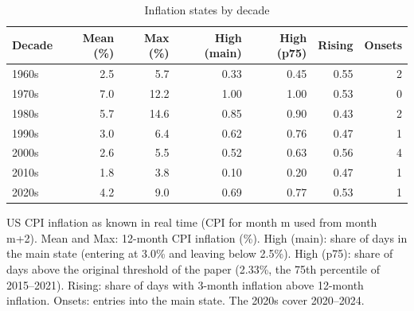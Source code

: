 \begin{table}[t]
\centering
\scriptsize
\caption{Inflation states by decade}
\label{tab:tab_inflation_by_decade}
\begin{tabular}{lrrrrrr}
\toprule
Decade & Mean (\%) & Max (\%) & High (main) & High (p75) & Rising & Onsets \\
\midrule
1960s & 2.5 & 5.7 & 0.33 & 0.45 & 0.55 & 2 \\
1970s & 7.0 & 12.2 & 1.00 & 1.00 & 0.53 & 0 \\
1980s & 5.7 & 14.6 & 0.85 & 0.90 & 0.43 & 2 \\
1990s & 3.0 & 6.4 & 0.62 & 0.76 & 0.47 & 1 \\
2000s & 2.6 & 5.5 & 0.52 & 0.63 & 0.56 & 4 \\
2010s & 1.8 & 3.8 & 0.10 & 0.20 & 0.47 & 1 \\
2020s & 4.2 & 9.0 & 0.69 & 0.77 & 0.53 & 1 \\
\bottomrule
\end{tabular}
\par\smallskip
\parbox{\linewidth}{\footnotesize US CPI inflation as known in real time (CPI for month m used from month m+2). Mean and Max: 12-month CPI inflation (\%). High (main): share of days in the main state (entering at 3.0\% and leaving below 2.5\%). High (p75): share of days above the original threshold of the paper (2.33\%, the 75th percentile of 2015--2021). Rising: share of days with 3-month inflation above 12-month inflation. Onsets: entries into the main state. The 2020s cover 2020--2024.}
\end{table}
